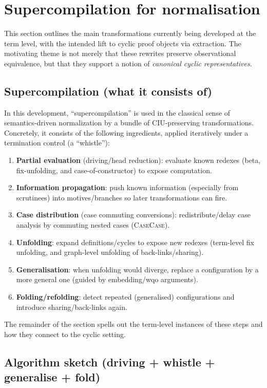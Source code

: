 \section{Supercompilation for normalisation}
\label{sec:transforms}

This section outlines the main transformations currently being developed at the term level, with the intended lift to cyclic proof objects via extraction.
The motivating theme is not merely that these rewrites preserve observational equivalence, but that they support a notion of \emph{canonical cyclic representatives}.

\subsection{Supercompilation (what it consists of)}

In this development, ``supercompilation'' is used in the classical sense of semantics-driven normalization by a bundle of CIU-preserving transformations.
Concretely, it consists of the following ingredients, applied iteratively under a termination control (a ``whistle''):
\begin{enumerate}
\item \textbf{Partial evaluation} (driving/head reduction): evaluate known redexes (beta, fix-unfolding, and case-of-constructor) to expose computation.
\item \textbf{Information propagation}: push known information (especially from scrutinees) into motives/branches so later transformations can fire.
\item \textbf{Case distribution} (case commuting conversions): redistribute/delay case analysis by commuting nested cases (\textsc{CaseCase}).
\item \textbf{Unfolding}: expand definitions/cycles to expose new redexes (term-level fix unfolding, and graph-level unfolding of back-links/sharing).
\item \textbf{Generalisation}: when unfolding would diverge, replace a configuration by a more general one (guided by embedding/wqo arguments).
\item \textbf{Folding/refolding}: detect repeated (generalised) configurations and introduce sharing/back-links again.
\end{enumerate}

The remainder of the section spells out the term-level instances of these steps and how they connect to the cyclic setting.

\subsection{Algorithm sketch (driving + whistle + generalise + fold)}

